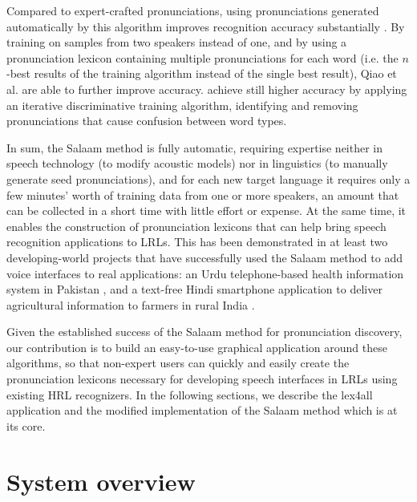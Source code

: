 \documentclass[11pt]{article}
\begin{document}
Compared to expert-crafted pronunciations, using pronunciations generated automatically by this algorithm improves recognition accuracy substantially \cite[\S5.2]{Qiao10}. By training on samples from two speakers instead of one, and by using a pronunciation lexicon containing multiple pronunciations for each word (i.e. the $n$-best results of the training algorithm instead of the single best result), Qiao et al. are able to further improve accuracy.  achieve still higher accuracy by applying an iterative discriminative training algorithm, identifying and removing pronunciations that cause confusion between word types.

In sum, the Salaam method is fully automatic, requiring expertise neither in speech technology (to modify acoustic models) nor in linguistics (to manually generate seed pronunciations), and for each new target language it requires only a few minutes' worth of training data from one or more speakers, an amount that can be collected in a short time with little effort or expense. At the same time, it enables the construction of pronunciation lexicons that can help bring speech recognition applications to LRLs. This has been demonstrated in at least two developing-world projects that have successfully used the Salaam method to add voice interfaces to real applications: an Urdu telephone-based health information system in Pakistan \cite{Sherwani09}, and a text-free Hindi smartphone application to deliver agricultural information to farmers in rural India \cite{bali13}.


Given the established success of the Salaam method for pronunciation discovery, our contribution is to build an easy-to-use graphical application around these algorithms, so that non-expert users can quickly and easily create the pronunciation lexicons necessary for developing speech interfaces in LRLs using existing HRL recognizers. In the following sections, we describe the lex4all application and the modified implementation of the Salaam method which is at its core.


\section{System overview}
\label{sec:overview}
\end{document}
